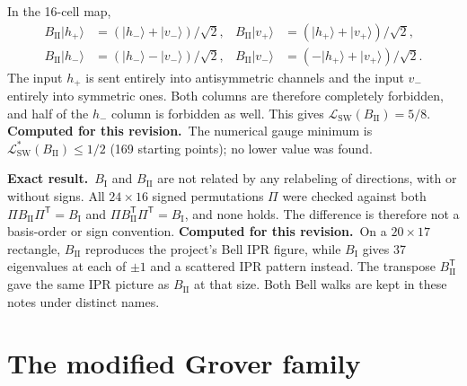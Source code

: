 \documentclass[11pt,a4paper,oneside]{report}
\newcommand{\ket}[1]{\lvert #1\rangle}
\newcommand{\sw}{\mathrm{SW}}
\newcommand{\exact}{\textbf{Exact result.}\ }
\newcommand{\session}{\textbf{Computed for this revision.}\ }
\numberwithin{equation}{chapter}
\begin{document}
In the 16-cell map,
\begin{align}
B_{\mathrm{II}}\ket{h_+}&=(\ket{h_-}+\ket{v_-})/\sqrt2,&
B_{\mathrm{II}}\ket{v_+}&=(\ket{h_+}+\ket{v_+})/\sqrt2,\\
B_{\mathrm{II}}\ket{h_-}&=(\ket{h_-}-\ket{v_-})/\sqrt2,&
B_{\mathrm{II}}\ket{v_-}&=(-\ket{h_+}+\ket{v_+})/\sqrt2.
\end{align}
The input \(h_+\) is sent entirely into antisymmetric channels and the
input \(v_-\) entirely into symmetric ones. Both columns are therefore
completely forbidden, and half of the \(h_-\) column is forbidden as
well. This gives \(\mathcal L_{\sw}(B_{\mathrm{II}})=5/8\).
\session The numerical gauge minimum is
\(\mathcal L^*_{\sw}(B_{\mathrm{II}})\le1/2\) (169 starting points); no
lower value was found.

\exact \(B_{\mathrm I}\) and \(B_{\mathrm{II}}\) are not related by any
relabeling of directions, with or without signs. All \(24\times16\)
signed permutations \(\Pi\) were checked against both
\(\Pi B_{\mathrm{II}}\Pi^{\mathsf T}=B_{\mathrm I}\) and
\(\Pi B_{\mathrm{II}}^{\mathsf T}\Pi^{\mathsf T}=B_{\mathrm I}\), and none
holds. The difference is therefore not a basis-order or sign
convention.
\session On a \(20\times17\) rectangle, \(B_{\mathrm{II}}\) reproduces
the project's Bell IPR figure, while \(B_{\mathrm I}\) gives 37
eigenvalues at each of \(\pm1\) and a scattered IPR pattern instead. The
transpose \(B_{\mathrm{II}}^{\mathsf T}\) gave the same IPR picture as
\(B_{\mathrm{II}}\) at that size. Both Bell walks are kept in these notes
under distinct names.

\section{The modified Grover family}
\label{sec:modcoin}
\end{document}
